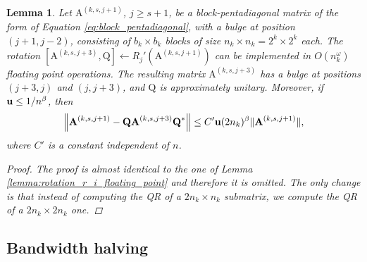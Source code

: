 \documentclass{article}
\newcommand{\lnorm}{\left\|}
\newcommand{\rnorm}{\right\|}
\newtheorem{lemma}{Lemma}[section]
\newcommand\matA{\boldsymbol{\mathrm{A}}}
\newcommand\matQ{\boldsymbol{\mathrm{Q}}}
\newcommand{\umach}{\textbf{\textup{u}}}
\newcommand{\cmm}{\beta}
\begin{document}
\begin{lemma}
    \label{lemma:rotation_r_i_prime_floating_point}
    Let $\matA^{(k,s,j+1)}$, $j\geq s+1$, be a block-pentadiagonal matrix of the form of Equation \eqref{eq:block_pentadiagonal}, with a bulge at position $(j+1,j-2)$, consisting of $b_k\times b_k$ blocks of size $n_k\times n_k=2^{k}\times 2^{k}$ each. The rotation $[\matA^{(k,s,j+3)},\matQ] \leftarrow R_j'(\matA^{(k,s,j+1)})$ can be implemented in $O(n_k^{\omega})$ floating point operations. The resulting matrix $\matA^{(k,s,j+3)}$ has a bulge at positions $(j+3,j)$ and $(j,j+3)$, and $\matQ$ is approximately unitary. Moreover, if $\umach\leq 1/n^{\cmm}$, then
    \begin{align*}
        \lnorm 
            \matA^{(k,s,j+1)} - \matQ\matA^{(k,s,j+3)} \matQ^*
        \rnorm
        \leq
        C'\umach (2n_k)^{\cmm}\|\matA^{(k,s,j+1)}\|,
    \end{align*}
    where $C'$ is a constant independent of $n$.
    \begin{proof}
        The proof is almost identical to the one of Lemma \ref{lemma:rotation_r_i_floating_point} and therefore it is omitted. The only change is that instead of computing the QR of a $2n_k\times n_k$ submatrix, we compute the QR of a $2n_k\times 2n_k$ one.
    \end{proof}
\end{lemma}


\subsection{Bandwidth halving}
\end{document}
